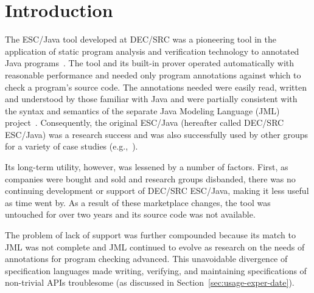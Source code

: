 \documentclass{llncs}
\begin{document}



\section{Introduction}

The ESC/Java tool developed at DEC/SRC was a pioneering tool in the
application of static program analysis and verification technology to
annotated Java programs~\cite{Flanagan-etal02}.  The tool and its
built-in prover operated automatically with reasonable performance and
needed only program annotations against which to check a program's
source code.  The annotations needed were easily read, written and
understood by those familiar with Java and were partially consistent
with the syntax and semantics of the separate Java Modeling Language
(JML) project~\cite{jmlpapers,Leavens-etal00}.  Consequently, the
original ESC/Java (hereafter called DEC/SRC ESC/Java) was a research
success and was also successfully used by other groups for a variety
of case studies (e.g.,~\cite{Hub03,HOP04}).

Its long-term utility, however, was lessened by a number of factors.
First, as companies were bought and sold and research groups
disbanded, there was no continuing development or support of DEC/SRC
ESC/Java, making it less useful as time went by.  As a result of these
marketplace changes, the tool was untouched for over two years and its
source code was not available.

The problem of lack of support was further compounded because its
match to JML was not complete and JML continued to evolve as research
on the needs of annotations for program checking advanced.  This
unavoidable divergence of specification languages made writing,
verifying, and maintaining specifications of non-trivial APIs
troublesome (as discussed in Section~\ref{sec:usage-exper-date}).
\end{document}
